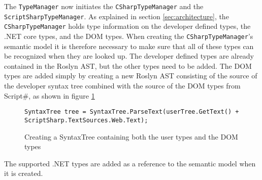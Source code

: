 
The \texttt{TypeManager} now initiates the \texttt{CSharpTypeManager} and the \texttt{ScriptSharpTypeManager}. As explained in section \ref{sec:architecture}, the \texttt{CSharpTypeManager} holds type information on the developer defined types, the .NET core types, and the DOM types.
 When creating the \texttt{CSharpTypeManager}'s semantic model it is therefore necessary to make sure that all of these types can be recognized when they are looked up. The developer defined types are already contained in the Roslyn AST, but the other types need to be added. The DOM types are added simply by creating a new Roslyn AST consisting of the source of the developer syntax tree combined with the source of the DOM types from Script\#, as shown in figure \ref{fig:init_mics_add_dom_types}

\begin{figure}[H]
\begin{lstlisting}[language=CSharp,classoffset=1,morekeywords={SyntaxTree}]
SyntaxTree tree = SyntaxTree.ParseText(userTree.GetText() + ScriptSharp.TextSources.Web.Text);
\end{lstlisting}
\caption{Creating a SyntaxTree containing both the user types and the DOM types}
\label{fig:init_mics_add_dom_types}
\end{figure}

The supported .NET types are added as a reference to the semantic model when it is created.






